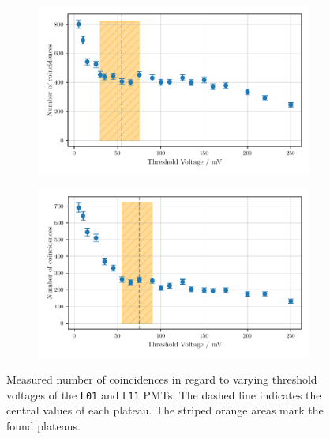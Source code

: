 \begin{figure}
    \centering
    \begin{subfigure}[b]{0.48\textwidth}
        \includegraphics[width=\textwidth]{plots/threshL01.pdf}
    \end{subfigure}\hfill
    \begin{subfigure}[b]{0.48\textwidth}
        \includegraphics[width=\textwidth]{plots/threshL11.pdf}
    \end{subfigure}
    \caption{Measured number of coincidences in regard to varying threshold voltages
    of the \texttt{L01} and \texttt{L11} PMTs.
    The dashed line indicates the central values of each plateau. The striped orange areas mark the found plateaus.}
    \label{fig:appthresh4}
\end{figure}
